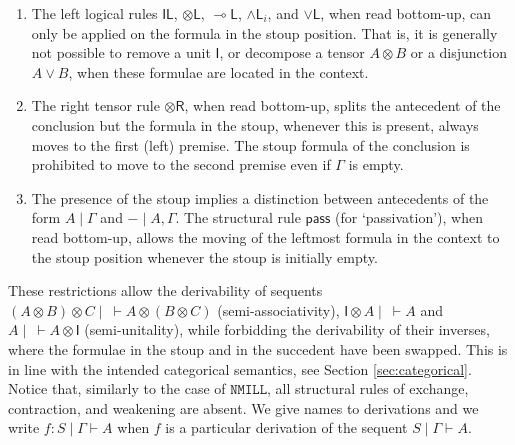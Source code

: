 \documentclass[submission,copyright,creativecommons]{eptcs}
\theoremstyle{definition}
\newcommand{\tl}{\otimes \mathsf{L}}
\newcommand{\tr}{\otimes \mathsf{R}}
\newcommand{\lleft}{{\multimap}\mathsf{L}}
\newcommand{\pass}{\mathsf{pass}}
\newcommand{\unitl}{\mathsf{IL}}
\newcommand{\andli}{\land \mathsf{L}_{i}}
\newcommand{\orl}{\lor \mathsf{L}}
\newcommand{\ot}{\otimes}
\newcommand{\lolli}{\multimap}
\newcommand{\illol}{\rotatebox[origin=c]{180}{$\multimap$}}
\newcommand{\I}{\mathsf{I}}
\newcommand{\NMILL}{$\mathtt{NMILL}$}
\newcommand{\SkNMILL}{$\mathtt{SkNMILL}$}
\begin{document}
\begin{enumerate}
\item The left logical rules $\unitl$, $\tl$, $\lleft$, $\andli$, and $\orl$, when read bottom-up, can only be applied on the formula in the stoup position. 
That is, it is generally not possible to remove a unit $\I$, or decompose a tensor $A \ot B$ or a disjunction $A \lor B$, when these formulae are located in the context.
\item The right tensor rule $\tr$, when read bottom-up, splits the antecedent of the conclusion but the formula in the stoup, whenever this is present, always moves to the first (left) premise.
The stoup formula of the conclusion is prohibited to move to the second premise even if $\Gamma$ is empty. 
\item The presence of the stoup implies a distinction between antecedents of the form $A \mid \Gamma$ and ${-} \mid A, \Gamma$. The structural rule $\pass$ (for `passivation'), when read bottom-up, allows the moving of the leftmost formula in the context to the stoup position whenever the stoup is initially empty.
\end{enumerate}
These restrictions allow the derivability of sequents $(A \ot B) \ot C \mid ~\vdash A \ot (B\ot C)$ (semi-associativity), $\I \ot A \mid ~ \vdash A$ and $A \mid ~ \vdash A \ot \I$ (semi-unitality), while forbidding the derivability of their inverses, where the formulae in the stoup and in the succedent have been swapped. This is in line with the intended categorical semantics, see Section \ref{sec:categorical}.
Notice that, similarly to the case of \NMILL, all structural rules of exchange, contraction, and weakening are absent. We give names to derivations and we write $f : S \mid \Gamma \vdash A$ when $f$ is a particular derivation of the sequent $S \mid \Gamma \vdash A$.
\end{document}
